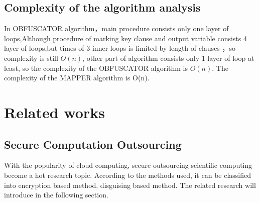 \documentclass[runningheads,a4paper]{llncs}
\begin{document}
\subsection{Complexity of the algorithm analysis} 

 In OBFUSCATOR algorithm，main procedure consists only one layer of loops,Although procedure of marking key clause and output variable consists 4 layer of loops,but times of 3 inner loops is limited by length of clauses ，so complexity is still $O(n)$, other part of algorithm consists only 1 layer of loop at least, so the complexity of the OBFUSCATOR algorithm is $O (n)$. The complexity of the  MAPPER algorithm is  O(n).
\section{Related works} 
\subsection{Secure Computation Outsourcing}

With the popularity of cloud computing, secure outsourcing scientific computing become a hot research topic.
According to the methods used, it can be classified into encryption based method, disguising based method.
The related research will introduce in the following section.
\end{document}
